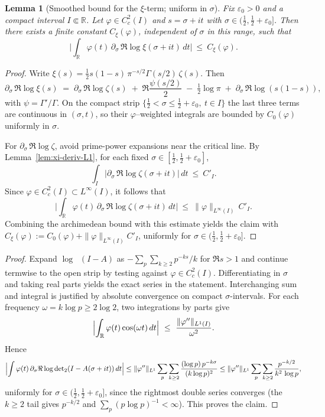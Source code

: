 \documentclass[11pt]{article}
\newtheorem{lemma}[theorem]{Lemma}
\theoremstyle{definition}
\theoremstyle{remark}
\newcommand{\R}{\mathbb{R}}
\DeclareMathOperator{\dettwo}{det_2}
\begin{document}
\begin{lemma}[Smoothed bound for the \(\xi\)-term; uniform in \(\sigma\)]\label{lem:xi-smoothed}
Fix \(\varepsilon_0>0\) and a compact interval \(I\Subset\R\). Let \(\varphi\in C_c^2(I)\) and \(s=\sigma+it\) with \(\sigma\in(\tfrac12,\tfrac12+\varepsilon_0]\). Then there exists a finite constant \(C_\xi(\varphi)\), independent of \(\sigma\) in this range, such that
\[
 \Big|\int_{\R}\varphi(t)\,\partial_\sigma\,\Re\log\xi(\sigma+it)\,dt\Big|\ \le\ C_\xi(\varphi).
\]
\end{lemma}
\begin{proof}
Write \(\xi(s)=\tfrac12 s(1-s)\,\pi^{-s/2}\Gamma(s/2)\,\zeta(s)\). Then
\[
 \partial_\sigma\,\Re\log\xi(s)\;=\;\partial_\sigma\,\Re\log\zeta(s)\; +\; \Re\frac{\psi(s/2)}{2}\; -\; \tfrac12\log\pi\; +\; \partial_\sigma\,\Re\log(s(1-s)),
\]
with \(\psi=\Gamma'/\Gamma\). On the compact strip \(\{\tfrac12<\sigma\le\tfrac12+\varepsilon_0,\ t\in I\}\) the last three terms are continuous in \((\sigma,t)\), so their \(\varphi\)–weighted integrals are bounded by \(C_0(\varphi)\) uniformly in \(\sigma\).

For \(\partial_\sigma\,\Re\log\zeta\), avoid prime-power expansions near the critical line. By Lemma~\ref{lem:xi-deriv-L1}, for each fixed \(\sigma\in[\tfrac12,\tfrac12+\varepsilon_0]\),
\[
 \int_I \Big|\partial_\sigma\,\Re\log\zeta(\sigma+it)\Big|\,dt\ \le\ C'_I.
\]
Since \(\varphi\in C_c^2(I)\subset L^\infty(I)\), it follows that
\[
 \Big|\int_{\R}\varphi(t)\,\partial_\sigma\,\Re\log\zeta(\sigma+it)\,dt\Big|\ \le\ \|\varphi\|_{L^\infty(I)}\,C'_I.
\]
Combining the archimedean bound with this estimate yields the claim with \(C_\xi(\varphi):=C_0(\varphi)+\|\varphi\|_{L^\infty(I)}C'_I\), uniformly for \(\sigma\in(\tfrac12,\tfrac12+\varepsilon_0]\).
\end{proof}
\begin{proof}
Expand \(\log\dettwo(I-A)\) as \(-\sum_{p}\sum_{k\ge2}p^{-ks}/k\) for \(\Re s>1\) and continue termwise to the open strip by testing against \(\varphi\in C_c^2(I)\). Differentiating in \(\sigma\) and taking real parts yields the exact series in the statement. Interchanging sum and integral is justified by absolute convergence on compact \(\sigma\)-intervals.
For each frequency \(\omega=k\log p\ge 2\log 2\), two integrations by parts give
\[
\Bigl|\int_{\R}\varphi(t)\cos(\omega t)\,dt\Bigr|\ \le\ \frac{\|\varphi''\|_{L^1(I)}}{\omega^2}.
\]
Hence
\[
\Bigl|\int \varphi(t)\,\partial_\sigma\Re\log\dettwo(I-A(\sigma+it))\,dt\Big|
\le \|\varphi''\|_{L^1}\sum_{p}\sum_{k\ge2}\frac{(\log p)\,p^{-k\sigma}}{(k\log p)^2}
\le \|\varphi''\|_{L^1}\sum_{p}\sum_{k\ge2}\frac{p^{-k/2}}{k^2\,\log p},
\]
uniformly for \(\sigma\in(\tfrac12,\tfrac12+\varepsilon_0]\), since the rightmost double series converges (the \(k\ge2\) tail gives \(p^{-k/2}\) and \(\sum_{p}(p\log p)^{-1}<\infty\)). This proves the claim.
\end{proof}
\end{document}
